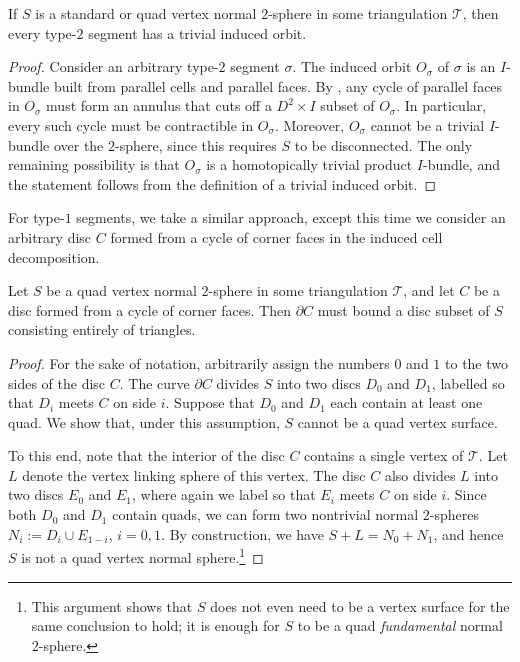 \documentclass[a4paper,UKenglish,cleveref, autoref, thm-restate]{lipics-v2021}
\newcommand{\tri}{\mathcal{T}}
\begin{document}
\begin{corollary}\label{cor:parallelRegion}
If $S$ is a standard or quad vertex normal $2$-sphere in some triangulation $\tri$, then every type-$2$ segment has a trivial induced orbit.
\end{corollary}

\begin{proof}
Consider an arbitrary type-$2$ segment $\sigma$.
The induced orbit $O_\sigma$ of $\sigma$ is an $I$-bundle built from parallel cells and parallel faces.
By , any cycle of parallel faces in $O_\sigma$ must form an annulus that cuts off a $D^2\times I$ subset of $O_\sigma$. In particular, every such cycle must be contractible in $O_\sigma$.
Moreover, $O_\sigma$ cannot be a trivial $I$-bundle over the $2$-sphere, since this requires $S$ to be disconnected.
The only remaining possibility is that $O_\sigma$ is a homotopically trivial product $I$-bundle, and the statement follows from the definition of a trivial induced orbit.
\end{proof}

For type-$1$ segments, we take a similar approach, except this time we consider an arbitrary disc $C$ formed from a cycle of corner faces in the induced cell decomposition.

\begin{lemma}\label{lem:cycleCorner}
Let $S$ be a quad vertex normal $2$-sphere in some triangulation $\tri$, and let $C$ be a disc formed from a cycle of corner faces. Then $\partial C$ must bound a disc subset of $S$ consisting entirely of triangles.
\end{lemma}



\begin{proof}
For the sake of notation, arbitrarily assign the numbers $0$ and $1$ to the two sides of the disc $C$.
The curve $\partial C$ divides $S$ into two discs $D_0$ and $D_1$, labelled so that $D_i$ meets $C$ on side $i$.
Suppose that $D_0$ and $D_1$ each contain at least one quad.
We show that, under this assumption, $S$ cannot be a quad vertex surface.

To this end, note that the interior of the disc $C$ contains a single vertex of $\tri$.
Let $L$ denote the vertex linking sphere of this vertex.
The disc $C$ also divides $L$ into two discs $E_0$ and $E_1$, where again we label so that $E_i$ meets $C$ on side $i$.
Since both $D_0$ and $D_1$ contain quads, we can form two nontrivial normal $2$-spheres $N_i := D_i\cup E_{1-i}$, $i=0,1$. By construction, we have $S + L = N_0 + N_1$, and hence $S$ is not a quad vertex normal sphere.\footnote{%
This argument shows that $S$ does not even need to be a vertex surface for the same conclusion to hold;
it is enough for $S$ to be a quad \emph{fundamental} normal $2$-sphere.}
\end{proof}
\end{document}
